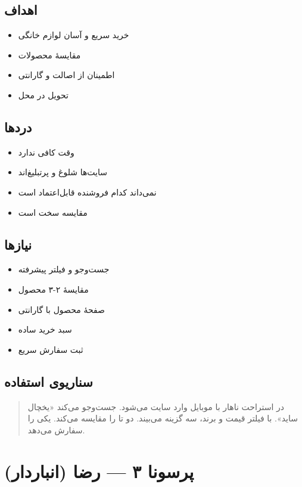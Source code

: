 \documentclass[12pt, a4paper]{article}
\begin{document}
\subsection{اهداف}
\begin{itemize}
    \item خرید سریع و آسان لوازم خانگی
    \item مقایسهٔ محصولات
    \item اطمینان از اصالت و گارانتی
    \item تحویل در محل
\end{itemize}

\subsection{دردها}
\begin{itemize}
    \item وقت کافی ندارد
    \item سایت‌ها شلوغ و پرتبلیغ‌اند
    \item نمی‌داند کدام فروشنده قابل‌اعتماد است
    \item مقایسه سخت است
\end{itemize}

\subsection{نیازها}
\begin{itemize}
    \item جست‌وجو و فیلتر پیشرفته
    \item مقایسهٔ ۲-۳ محصول
    \item صفحهٔ محصول با گارانتی
    \item سبد خرید ساده
    \item ثبت سفارش سریع
\end{itemize}

\subsection{سناریوی استفاده}
\begin{quote}
در استراحت ناهار با موبایل وارد سایت می‌شود.
جست‌وجو می‌کند «یخچال ساید». با فیلتر قیمت
و برند، سه گزینه می‌بیند. دو تا را مقایسه می‌کند.
یکی را سفارش می‌دهد.
\end{quote}

\section{پرسونا ۳ — رضا (انباردار)}
\end{document}
